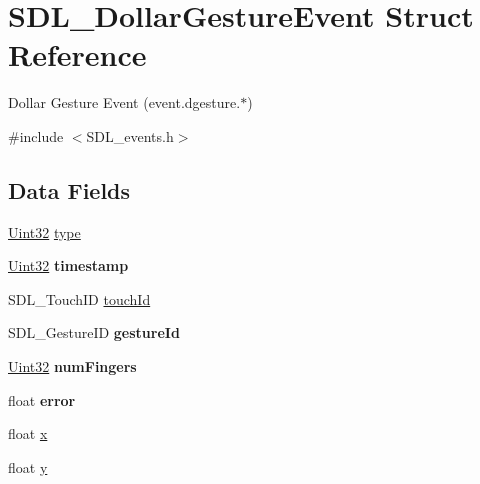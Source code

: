 \hypertarget{struct_s_d_l___dollar_gesture_event}{}\section{S\+D\+L\+\_\+\+Dollar\+Gesture\+Event Struct Reference}
\label{struct_s_d_l___dollar_gesture_event}


Dollar Gesture Event (event.\+dgesture.$\ast$)  




{\ttfamily \#include $<$S\+D\+L\+\_\+events.\+h$>$}

\subsection*{Data Fields}
\begin{DoxyCompactItemize}
\item 
\hyperlink{_s_d_l__stdinc_8h_add440eff171ea5f55cb00c4a9ab8672d}{Uint32} \hyperlink{struct_s_d_l___dollar_gesture_event_aa40a9b05c3154032b9f2d7220e9f08dc}{type}
\item 
\hyperlink{_s_d_l__stdinc_8h_add440eff171ea5f55cb00c4a9ab8672d}{Uint32} {\bfseries timestamp}\hypertarget{struct_s_d_l___dollar_gesture_event_abf1ed7edeab81db9c05d899836a44a2f}{}\label{struct_s_d_l___dollar_gesture_event_abf1ed7edeab81db9c05d899836a44a2f}

\item 
S\+D\+L\+\_\+\+Touch\+ID \hyperlink{struct_s_d_l___dollar_gesture_event_a35f615f6a1333a7d89297b58ed1e9bbb}{touch\+Id}
\item 
S\+D\+L\+\_\+\+Gesture\+ID {\bfseries gesture\+Id}\hypertarget{struct_s_d_l___dollar_gesture_event_ad3686651e65f306de48618ca5c121241}{}\label{struct_s_d_l___dollar_gesture_event_ad3686651e65f306de48618ca5c121241}

\item 
\hyperlink{_s_d_l__stdinc_8h_add440eff171ea5f55cb00c4a9ab8672d}{Uint32} {\bfseries num\+Fingers}\hypertarget{struct_s_d_l___dollar_gesture_event_a55993ff0c72b4edca92780d6016b88af}{}\label{struct_s_d_l___dollar_gesture_event_a55993ff0c72b4edca92780d6016b88af}

\item 
float {\bfseries error}\hypertarget{struct_s_d_l___dollar_gesture_event_a7cfd13d282af770aaa971755fa092fca}{}\label{struct_s_d_l___dollar_gesture_event_a7cfd13d282af770aaa971755fa092fca}

\item 
float \hyperlink{struct_s_d_l___dollar_gesture_event_ad0da36b2558901e21e7a30f6c227a45e}{x}
\item 
float \hyperlink{struct_s_d_l___dollar_gesture_event_aa4f0d3eebc3c443f9be81bf48561a217}{y}
\end{DoxyCompactItemize}


